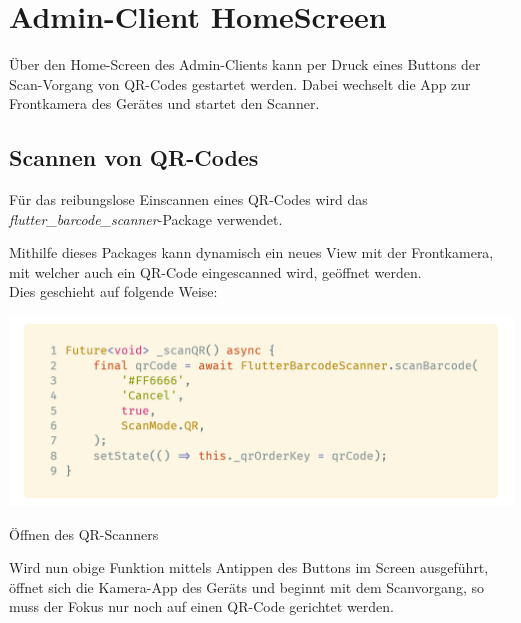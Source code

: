 \section{Admin-Client HomeScreen}

Über den Home-Screen des Admin-Clients kann per Druck eines Buttons der Scan-Vorgang
von QR-Codes gestartet werden. Dabei wechselt die App zur Frontkamera des Gerätes und startet den Scanner.

\subsection{Scannen von QR-Codes}

Für das reibungslose Einscannen eines QR-Codes wird das \textit{flutter\_barcode\_scanner}-Package
verwendet.\cite{flutterBarcodeScanner2021}

Mithilfe dieses Packages kann dynamisch ein neues View mit der Frontkamera, mit welcher auch 
ein QR-Code eingescanned wird, geöffnet werden.\\
Dies geschieht auf folgende Weise:

\begin{code}[H]
    \centering
    \includegraphics[width=1\textwidth]{images/Admin-Client/screens/scanQR.png}
    \vspace{-25pt}
    \caption{Öffnen des QR-Scanners}
\end{code}

Wird nun obige Funktion mittels Antippen des Buttons im Screen ausgeführt, öffnet sich die 
Kamera-App des Geräts und beginnt mit dem Scanvorgang, so muss der Fokus nur noch auf einen 
QR-Code gerichtet werden.

